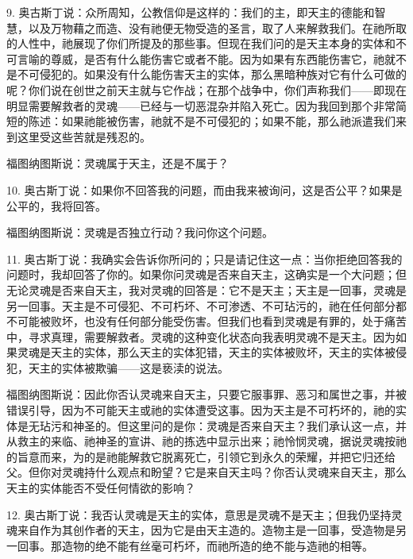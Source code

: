 9. 奥古斯丁说：众所周知，公教信仰是这样的：我们的主，即天主的德能和智慧，以及万物藉之而造、没有祂便无物受造的圣言，取了人来解救我们。在祂所取的人性中，祂展现了你们所提及的那些事。但现在我们问的是天主本身的实体和不可言喻的尊威，是否有什么能伤害它或者不能。因为如果有东西能伤害它，祂就不是不可侵犯的。如果没有什么能伤害天主的实体，那么黑暗种族对它有什么可做的呢？你们说在创世之前天主就与它作战；在那个战争中，你们声称我们——即现在明显需要解救者的灵魂——已经与一切恶混杂并陷入死亡。因为我回到那个非常简短的陈述：如果祂能被伤害，祂就不是不可侵犯的；如果不能，那么祂派遣我们来到这里受这些苦就是残忍的。\par

福图纳图斯说：灵魂属于天主，还是不属于？\par

10. 奥古斯丁说：如果你不回答我的问题，而由我来被询问，这是否公平？如果是公平的，我将回答。\par

福图纳图斯说：灵魂是否独立行动？我问你这个问题。\par

11. 奥古斯丁说：我确实会告诉你所问的；只是请记住这一点：当你拒绝回答我的问题时，我却回答了你的。如果你问灵魂是否来自天主，这确实是一个大问题；但无论灵魂是否来自天主，我对灵魂的回答是：它不是天主；天主是一回事，灵魂是另一回事。天主是不可侵犯、不可朽坏、不可渗透、不可玷污的，祂在任何部分都不可能被败坏，也没有任何部分能受伤害。但我们也看到灵魂是有罪的，处于痛苦中，寻求真理，需要解救者。灵魂的这种变化状态向我表明灵魂不是天主。因为如果灵魂是天主的实体，那么天主的实体犯错，天主的实体被败坏，天主的实体被侵犯，天主的实体被欺骗——这是亵渎的说法。\par

福图纳图斯说：因此你否认灵魂来自天主，只要它服事罪、恶习和属世之事，并被错误引导，因为不可能天主或祂的实体遭受这事。因为天主是不可朽坏的，祂的实体是无玷污和神圣的。但这里问的是你：灵魂是否来自天主？我们承认这一点，并从救主的来临、祂神圣的宣讲、祂的拣选中显示出来；祂怜悯灵魂，据说灵魂按祂的旨意而来，为的是祂能解救它脱离死亡，引领它到永久的荣耀，并把它归还给父。但你对灵魂持什么观点和盼望？它是来自天主吗？你否认灵魂来自天主，那么天主的实体能否不受任何情欲的影响？\par

12. 奥古斯丁说：我否认灵魂是天主的实体，意思是灵魂不是天主；但我仍坚持灵魂来自作为其创作者的天主，因为它是由天主造的。造物主是一回事，受造物是另一回事。那造物的绝不能有丝毫可朽坏，而祂所造的绝不能与造祂的相等。\par

